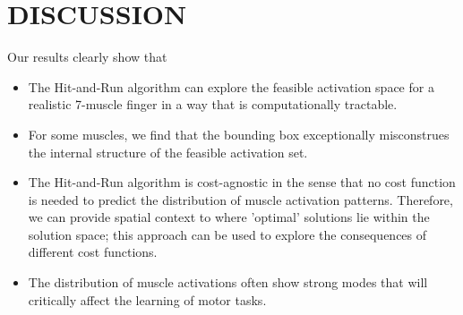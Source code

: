 \section{DISCUSSION}

Our results clearly show that\\
\begin{itemize}
	\item The Hit-and-Run algorithm can explore the feasible activation space for a realistic 7-muscle finger in a way that is computationally tractable.\\
	\item For some muscles, we find that the bounding box exceptionally misconstrues the internal structure of the feasible activation set.\\
	\item The Hit-and-Run algorithm is cost-agnostic in the sense that no cost function is needed to predict the distribution of muscle activation patterns. Therefore, we can provide spatial context to where 'optimal' solutions lie within the solution space; this approach can be used to explore the consequences of different cost functions.\\
	\item The distribution of muscle activations often show strong modes that will critically affect the learning of motor tasks.

\end{itemize}